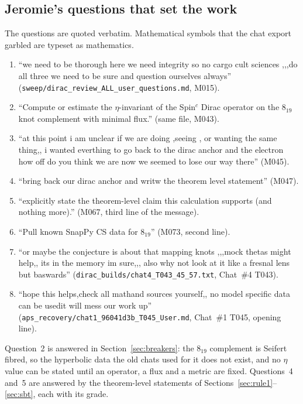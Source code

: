 \documentclass[11pt]{article}
\theoremstyle{definition}
\begin{document}
\subsection{Jeromie's questions that set the work}
The questions are quoted verbatim. Mathematical symbols that the chat export garbled are typeset as mathematics.
\begin{enumerate}[leftmargin=2em]
\item ``we need to be thorough here we need integrity so no cargo cult sciences ,,,do all three we need to be sure and question ourselves always'' (\texttt{sweep/dirac\_review\_ALL\_user\_questions.md}, M015).
\item ``Compute or estimate the $\eta$-invariant of the Spin$^c$ Dirac operator on the $8_{19}$ knot complement with minimal flux.'' (same file, M043).
\item ``at this point i am unclear if we are doing ,seeing , or wanting  the same thing,, i wanted everthing to go back to the dirac anchor and the electron how off do you think we are now we seemed to lose our way there'' (M045).
\item ``bring back our dirac anchor and writw the theorem level statement'' (M047).
\item ``explicitly state the theorem-level claim this calculation supports (and nothing more).'' (M067, third line of the message).
\item ``Pull known SnapPy CS data for $8_{19}$'' (M073, second line).
\item ``or maybe the conjecture is about that mapping knots ,,,mock thetas might help,, its in the memory im sure,,, also why not look at it like a fresnal lens but baswards'' (\texttt{dirac\_builds/chat4\_T043\_45\_57.txt}, Chat~\#4 T043).
\item ``hope this helps,check all mathand sources yourself,, no model specific data can be usedit will mess our work up'' (\texttt{aps\_recovery/chat1\_96041d3b\_T045\_User.md}, Chat~\#1 T045, opening line).
\end{enumerate}
Question~2 is answered in Section~\ref{sec:breakers}: the $8_{19}$ complement is Seifert fibred, so the hyperbolic data the old chats used for it does not exist, and no $\eta$ value can be stated until an operator, a flux and a metric are fixed. Questions~4 and~5 are answered by the theorem-level statements of Sections~\ref{sec:rule1}--\ref{sec:sbt}, each with its grade.
\end{document}
